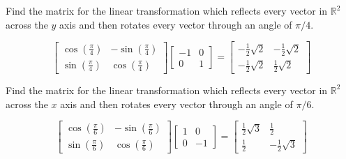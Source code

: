 \documentclass{ximera}
\begin{document}
\begin{problem}\label{prb:6.21} Find the matrix for the linear transformation which reflects every
vector in $\mathbb{R}^{2}$ across the $y$ axis and then rotates every vector
through an angle of $\pi /4$.
\begin{hint}
\[
\left[
\begin{array}{cc}
\cos \left( \frac{\pi }{4}\right)  & -\sin \left( \frac{\pi }{4}\right)  \\
\sin \left( \frac{\pi }{4}\right)  & \cos \left( \frac{\pi }{4}\right)
\end{array}
\right] \left[
\begin{array}{rr}
-1 & 0 \\
0 & 1
\end{array}
\right] = \left[
\begin{array}{cc}
-\frac{1}{2}\sqrt{2} & -\frac{1}{2}\sqrt{2} \\
-\frac{1}{2}\sqrt{2} & \frac{1}{2}\sqrt{2}
\end{array}
\right]
\]
\end{hint}
\end{problem}

\begin{problem}\label{prb:6.22} Find the matrix for the linear transformation which reflects every
vector in $\mathbb{R}^{2}$ across the $x$ axis and then rotates every vector
through an angle of $\pi /6$.
\begin{hint}
\[
\left[
\begin{array}{cc}
\cos \left( \frac{\pi }{6}\right)  & -\sin \left( \frac{\pi }{6}\right)  \\
\sin \left( \frac{\pi }{6}\right)  & \cos \left( \frac{\pi }{6}\right)
\end{array}
\right] \left[
\begin{array}{rr}
1 & 0 \\
0 & -1
\end{array}
\right] =  \left[
\begin{array}{cc}
\frac{1}{2}\sqrt{3} & \frac{1}{2} \\
\frac{1}{2} & -\frac{1}{2}\sqrt{3}
\end{array}
\right]
\]
\end{hint}
\end{problem}
\end{document}
